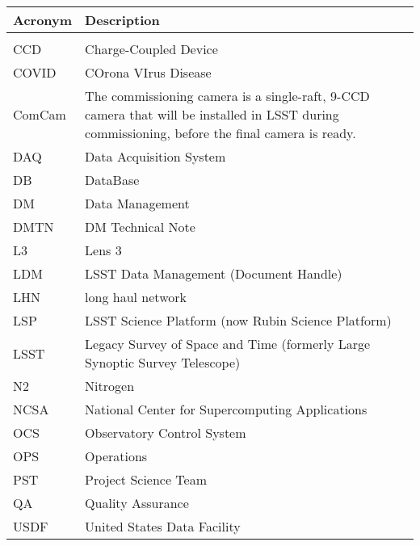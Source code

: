 \addtocounter{table}{-1}
\begin{longtable}{p{}p{}}\hline
\textbf{Acronym} & \textbf{Description}  \\\hline

 &  \\\hline
CCD & Charge-Coupled Device \\\hline
COVID & COrona VIrus Disease \\\hline
ComCam & The commissioning camera is a single-raft, 9-CCD camera that will be installed in LSST during commissioning, before the final camera is ready. \\\hline
DAQ & Data Acquisition System \\\hline
DB & DataBase \\\hline
DM & Data Management \\\hline
DMTN & DM Technical Note \\\hline
L3 & Lens 3 \\\hline
LDM & LSST Data Management (Document Handle) \\\hline
LHN & long haul network \\\hline
LSP & LSST Science Platform (now Rubin Science Platform) \\\hline
LSST & Legacy Survey of Space and Time (formerly Large Synoptic Survey Telescope) \\\hline
N2 & Nitrogen \\\hline
NCSA & National Center for Supercomputing Applications \\\hline
OCS & Observatory Control System \\\hline
OPS & Operations \\\hline
PST & Project Science Team \\\hline
QA & Quality Assurance \\\hline
USDF & United States Data Facility \\\hline
\end{longtable}
